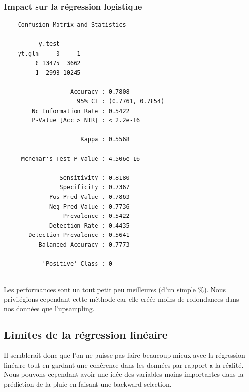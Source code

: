 \documentclass{article}
\begin{document}
\subsubsection{Impact sur la régression logistique}
\begin{multicols}{2}
    \begin{verbatim}
    Confusion Matrix and Statistics
  
          y.test
    yt.glm     0     1
         0 13475  3662
         1  2998 10245
                                              
                   Accuracy : 0.7808          
                     95% CI : (0.7761, 0.7854)
        No Information Rate : 0.5422          
        P-Value [Acc > NIR] : < 2.2e-16       
                                              
                      Kappa : 0.5568          
                                              
     Mcnemar's Test P-Value : 4.506e-16       
                                              
                Sensitivity : 0.8180          
                Specificity : 0.7367          
             Pos Pred Value : 0.7863          
             Neg Pred Value : 0.7736          
                 Prevalence : 0.5422          
             Detection Rate : 0.4435          
       Detection Prevalence : 0.5641          
          Balanced Accuracy : 0.7773          

           'Positive' Class : 0 
                                 
    \end{verbatim}
\end{multicols}

Les performances sont un tout petit peu meilleures (d'un simple \%). Nous privilégions cependant cette méthode car elle créée moins de redondances dans nos données que l'upsampling. 

\subsection{Limites de la régression linéaire}

Il semblerait donc que l'on ne puisse pas faire beaucoup mieux avec la régression linéaire tout en gardant une cohérence dans les données par rapport à la réalité. Nous pouvons cependant avoir une idée des variables moins importantes dans la prédiction de la pluie en faisant une backward selection. 

\newpage
\printbibliography
\end{document}
